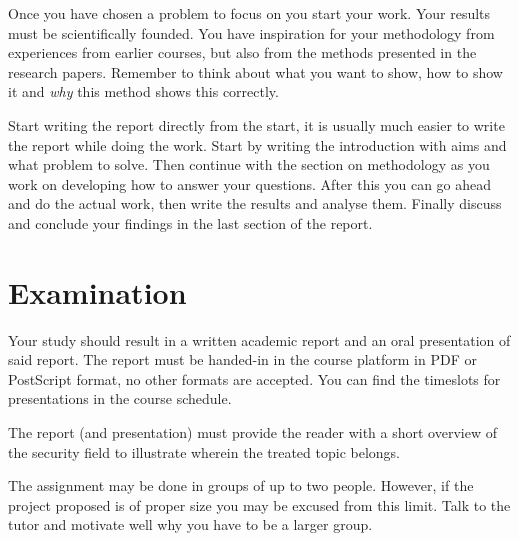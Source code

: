 \documentclass[a4paper]{llncs}
\begin{document}
Once you have chosen a problem to focus on you start your work.
Your results must be scientifically founded.
You have inspiration for your methodology from experiences from earlier 
courses, but also from the methods presented in the research papers.
Remember to think about what you want to show, how to show it and \emph{why} 
this method shows this correctly.

Start writing the report directly from the start, it is usually much easier to 
write the report while doing the work.
Start by writing the introduction with aims and what problem to solve.
Then continue with the section on methodology as you work on developing how to 
answer your questions.
After this you can go ahead and do the actual work, then write the results and 
analyse them.
Finally discuss and conclude your findings in the last section of the report.


\section{Examination}%
\label{sec:exam}

Your study should result in a written academic report and an oral presentation 
of said report.
The report must be handed-in in the course platform in PDF or PostScript 
format, no other formats are accepted.
You can find the timeslots for presentations in the course schedule.

The report (and presentation) must provide the reader with a short overview of 
the security field to illustrate wherein the treated topic belongs.

The assignment may be done in groups of up to two people.
However, if the project proposed is of proper size you may be excused from this 
limit.
Talk to the tutor and motivate well why you have to be a larger group.


\printbibliography{}
\end{document}
